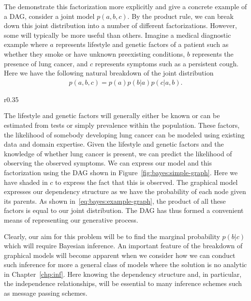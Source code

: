 The demonstrate this factorization more explicitly and give a concrete example of a DAG, consider a joint model
$p(a,b,c)$.  By the product rule, we can break down this joint distribution into a number of different
factorizations.  However, some will typically be more useful than others.  Imagine a medical diagnostic
example where $a$ represents lifestyle and genetic factors of a patient such as whether they smoke
or have unknown preexisting conditions, 
$b$ represents the presence of lung cancer, and $c$ represents symptoms 
such as a persistent cough.  Here we have the following natural breakdown of the joint distribution
\begin{align}
\label{eq:bayes:example-graph}
p(a,b,c) = p(a) p(b|a) p(c|a,b).
\end{align}
\begin{wrapfigure}{r}{0.35\textwidth}
	\vspace{-12pt}
	\centering 
	\resizebox{.32\textwidth}{!}{
		
	}
	\caption{Simple example DAG corresponding to~\eqref{eq:bayes:example-graph}
		\label{fig:bayes:simple-graph}}
	\vspace{-10pt}
\end{wrapfigure}
The lifestyle and genetic factors will generally either be known or can be estimated from tests or
simply prevalence within the population.  These factors, the likelihood of somebody developing
lung cancer can be modeled using existing data and domain expertise.   Given the lifestyle and
genetic factors and the knowledge of whether lung cancer is present, we can predict the likelihood
of observing the observed symptoms.  We can express our model and this factorization using
the DAG shown in Figure~\ref{fig:bayes:simple-graph}.
  Here we have shaded in $c$ to express the fact that this is
observed.  The graphical model expresses our dependency structure as we have the probability
of each node given its parents.  As shown in~\eqref{eq:bayes:example-graph}, the product of
all these factors is equal to our joint distribution.  The DAG has thus formed a convenient means
of representing our generative process.

Clearly, our aim for this problem will be to find the marginal probability $p(b|c)$ which will
require Bayesian inference.
An important feature of the breakdown of graphical models will become apparent when we
consider how we can conduct such inference for more a general class of 
models where the solution is no analytic in Chapter~\ref{chp:inf}.  Here knowing the dependency
structure and, in particular, the independence relationships, will be essential to many inference 
schemes such as message passing schemes.

